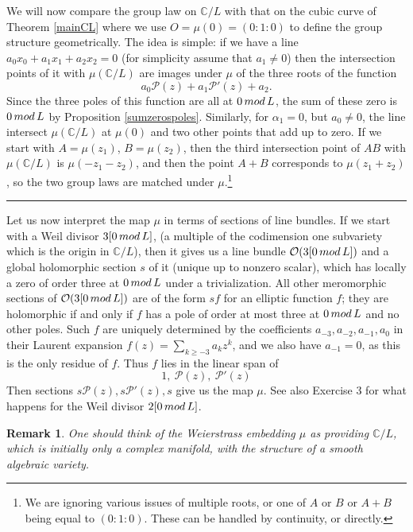 \documentclass[11pt]{article}
\numberwithin{equation}{section}
\numberwithin{footnote}{section}
\newtheorem{rem}[thm]{Remark}
\newcommand{\blue}{\color{blue}}
\newcommand{\C}{{\mathbb C}}
\begin{document}
\smallskip{\blue \hrule}
We will now compare the group law on $\C/L$ with that on the cubic curve of Theorem \ref{mainCL} where we use $O=\mu(0)=(0:1:0)$ to define the group structure geometrically. The idea is simple: if we have a line $a_0 x_0 + a_1 x_1 + a_2 x_2 = 0$ (for simplicity assume that $a_1\neq 0$) then the intersection points of it with $\mu(\C/L)$ are images under $\mu$ of the three roots of the function
$$
a_0 \mathcal P(z) + a_1 \mathcal P'(z) + a_2.
$$
Since the three poles of this function are all at $0\,{\rm mod}\,L$, the sum of these zero is $0\,{\rm mod}\,L$ by Proposition \ref{sumzerospoles}. Similarly, for $\alpha_1=0$, but $a_0\neq 0$, the line intersect $\mu(\C/L)$ at $\mu(0)$ and two other points that add up to zero. If we start with $A=\mu(z_1)$, $B=\mu(z_2)$, then the third intersection point of $AB$ with $\mu(\C/L)$ is $\mu(-z_1-z_2)$, and then the point $A+B$ corresponds to $\mu(z_1 +z_2)$, so the two group laws are matched under $\mu$.\footnote{ We are ignoring various issues of multiple roots, or one of $A$ or $B$ or $A+B$ being equal to $(0:1:0)$. These can be handled by continuity, or directly.}
 
\smallskip
{\blue \hrule}
Let us now interpret the map $\mu$ in terms of sections of line bundles. If we start with a Weil divisor $3[0\,{\rm mod}\,L]$, (a multiple of the codimension one subvariety which is the origin in $\C/L$), then it gives us a line bundle $\mathcal O(3[0\,{\rm mod}\,L])$ and a global holomorphic section $s$ of it (unique up to nonzero scalar), which has locally a zero of order three at $0\,{\rm mod}\,L$ under a trivialization. All other meromorphic sections of $\mathcal O(3[0\,{\rm mod}\,L])$  are of the form $s f$ for an elliptic function $f$; they are holomorphic if and only if $f$ has a pole of order at most three at $0\,{\rm mod}\,L$ and no other poles. Such $f$ are uniquely determined by the coefficients $a_{-3},a_{-2},a_{-1},a_0$ in their Laurent expansion $f(z)=\sum_{k\geq -3} a_kz^{k}$, and we also have $a_{-1}=0$, as this is the only residue of $f$. Thus $f$ lies in the linear span of  
$$
1,~\mathcal P(z), ~\mathcal P'(z)
$$
Then sections $s \mathcal P(z), s \mathcal P'(z), s$ give us the map $\mu$. See also Exercise 3 for what happens for the Weil divisor $2[0\,{\rm mod}\,L]$.

\smallskip
\begin{rem}
One should think of the Weierstrass embedding $\mu$ as providing $\C/L$, which is initially only a complex manifold, with the structure of 
a smooth algebraic variety.
\end{rem}
\end{document}
